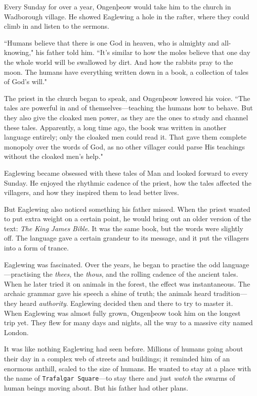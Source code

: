 Every Sunday for over a year, Ongenþeow would take him to the church in Wadborough village.
He showed Eaglewing a hole in the rafter, where they could climb in and listen to the sermons.

``Humans believe that there is one God in heaven, who is almighty and all-knowing," his father told him.
``It's similar to how the moles believe that one day the whole world will be swallowed by dirt.
And how the rabbits pray to the moon.
The humans have everything written down in a book, a collection of tales of God's will."

The priest in the church began to speak, and Ongenþeow lowered his voice.
``The tales are powerful in and of themselves---teaching the humans how to behave.
But they also give the cloaked men power, as they are the ones to study and channel these tales.
Apparently, a long time ago, the book was written in another language entirely; only the cloaked men could read it.
That gave them complete monopoly over the words of God, as no other villager could parse His teachings without the cloaked men's help."

Eaglewing became obsessed with these tales of Man and looked forward to every Sunday.
He enjoyed the rhythmic cadence of the priest, how the tales affected the villagers, and how they inspired them to lead better lives.

But Eaglewing also noticed something his father missed.
When the priest wanted to put extra weight on a certain point, he would bring out an older version of the text: \textit{The King James Bible}.
It was the same book, but the words were slightly off.
The language gave a certain grandeur to its message, and it put the villagers into a form of trance.

Eaglewing was fascinated.
Over the years, he began to practise the odd language---practising the \textit{thees}, the \textit{thous}, and the rolling cadence of the ancient tales.
When he later tried it on animals in the forest, the effect was instantaneous.
The archaic grammar gave his speech a shine of truth; the animals heard tradition---they heard \textit{authority}.
Eaglewing decided then and there to try to master it.\\

When Eaglewing was almost fully grown, Ongenþeow took him on the longest trip yet.
They flew for many days and nights, all the way to a massive city named London.

It was like nothing Eaglewing had seen before.
Millions of humans going about their day in a complex web of streets and buildings; it reminded him of an enormous anthill, scaled to the size of humans.
He wanted to stay at a place with the name of \texttt{Trafalgar Square}---to stay there and just \textit{watch} the swarms of human beings moving about.
But his father had other plans.

